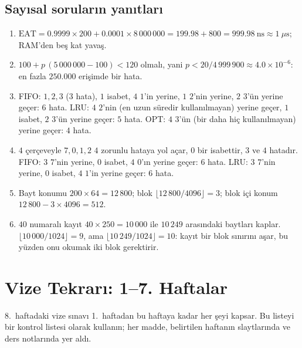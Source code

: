 \subsection*{Sayısal soruların yanıtları}
\begin{enumerate}[leftmargin=1.6em,start=11]
  \item $\text{EAT} = 0.9999 \times 200 + 0.0001 \times 8\,000\,000 = 199.98 + 800 = 999.98\ \text{ns} \approx 1\ \mu\text{s}$; RAM'den beş kat yavaş.
  \item $100 + p\,(5\,000\,000 - 100) < 120$ olmalı, yani $p < 20/4\,999\,900 \approx 4.0\times10^{-6}$: en fazla $250.000$ erişimde bir hata.
  \item FIFO: $1,2,3$ (3 hata), $1$ isabet, $4$ $1$'in yerine, $1$ $2$'nin yerine, $2$ $3$'ün yerine geçer: $6$ hata. LRU: $4$ $2$'nin (en uzun süredir kullanılmayan) yerine geçer, $1$ isabet, $2$ $3$'ün yerine geçer: $5$ hata. OPT: $4$ $3$'ün (bir daha hiç kullanılmayan) yerine geçer: $4$ hata.
  \item $4$ çerçeveyle $7,0,1,2$ $4$ zorunlu hataya yol açar, $0$ bir isabettir, $3$ ve $4$ hatadır. FIFO: $3$ $7$'nin yerine, $0$ isabet, $4$ $0$'ın yerine geçer: $6$ hata. LRU: $3$ $7$'nin yerine, $0$ isabet, $4$ $1$'in yerine geçer: $6$ hata.
  \item Bayt konumu $200 \times 64 = 12\,800$; blok $\lfloor 12\,800/4096 \rfloor = 3$; blok içi konum $12\,800 - 3\times 4096 = 512$.
  \item $40$ numaralı kayıt $40 \times 250 = 10\,000$ ile $10\,249$ arasındaki baytları kaplar. $\lfloor 10\,000/1024 \rfloor = 9$, ama $\lfloor 10\,249/1024 \rfloor = 10$: kayıt bir blok sınırını aşar, bu yüzden onu okumak iki blok gerektirir.
\end{enumerate}

\section{Vize Tekrarı: 1--7. Haftalar}

8.\ haftadaki vize sınavı 1.\ haftadan bu haftaya kadar her şeyi kapsar. Bu listeyi bir kontrol listesi olarak kullanın; her madde, belirtilen haftanın slaytlarında ve ders notlarında yer aldı.

